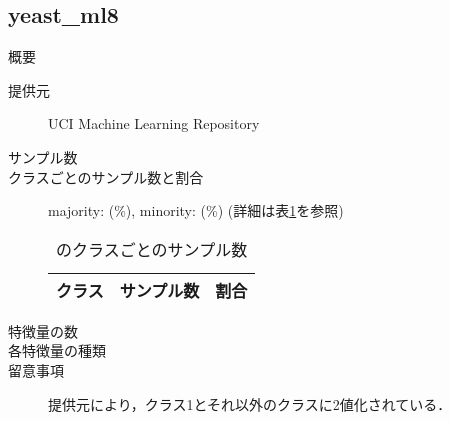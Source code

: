 \subsection{yeast\_ml8}
\begin{description}
    \item[概要] \cite{}
    \item[提供元] UCI Machine Learning Repository
    \item[サンプル数] 
    \item[クラスごとのサンプル数と割合] majority:  (\%), minority:  (\%) (詳細は表\ref{tab:}を参照)

        \begin{table}[htbp]
            \centering
            \caption{のクラスごとのサンプル数}
            \label{tab:}
            \begin{tabular}{lrc} \hline
                \multicolumn{1}{c}{クラス}&
                \multicolumn{1}{c}{サンプル数}&
                \multicolumn{1}{c}{割合}\\
                \hline
                \hline

                \hline
            \end{tabular}
        \end{table}

    \item[特徴量の数] 
    \item[各特徴量の種類] \mbox{}
        
    \item[留意事項] 提供元により，クラス1とそれ以外のクラスに2値化されている．
\end{description}

